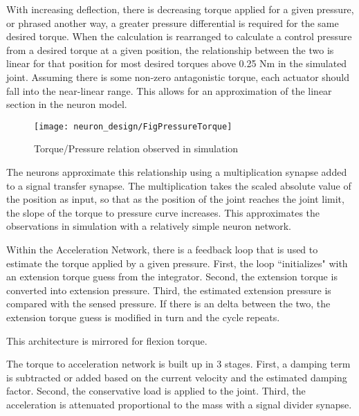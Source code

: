With increasing deflection, there is decreasing torque applied for a given
pressure, or phrased another way, a greater pressure differential is required
for the same desired torque. When the calculation is rearranged to calculate
a control pressure from a desired torque at a given position, the relationship
between the two is linear for that position for most desired torques above
0.25 Nm in the simulated joint. Assuming there is some non-zero antagonistic
torque, each actuator should fall into the near-linear range. This allows for
an approximation of the linear section in the neuron model.

\begin{figure}[h!]
\centering
\texttt{[image: neuron\_design/FigPressureTorque]}
\caption{Torque/Pressure relation observed in simulation}
\label{fig:PressureTorque}
\end{figure}

The neurons approximate this relationship using a multiplication synapse added
to a signal transfer synapse. The multiplication takes the scaled absolute 
value of the position as input, so that as the position of the joint reaches
the joint limit, the slope of the torque to pressure curve increases. This
approximates the observations in simulation with a relatively simple neuron
network.



Within the Acceleration Network, there is a feedback loop that is used to 
estimate the torque applied by a given pressure. First, the loop ``initializes"
with an extension torque guess from the integrator. Second, the extension
torque is converted into extension pressure. Third, the estimated extension
pressure is compared with the sensed pressure. If there is an delta between the
two, the extension torque guess is modified in turn and the cycle repeats.


This architecture is mirrored for flexion torque.


The torque to acceleration network is built up in 3 stages. First, a damping 
term is subtracted or added based on the current velocity and the estimated
damping factor. Second, the conservative load is applied to the joint. Third,
the acceleration is attenuated proportional to the mass with a signal divider
synapse.

